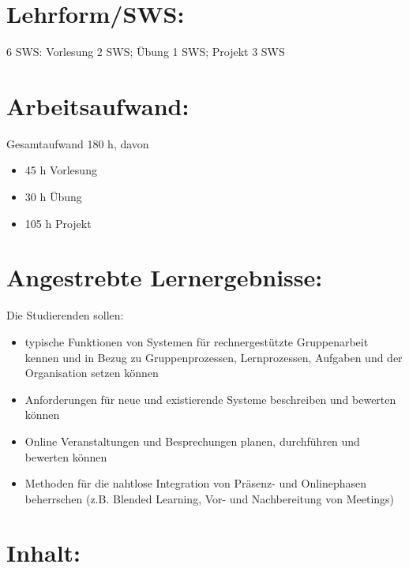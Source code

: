 \section*{Lehrform/SWS:}\label{lehrformsws-13}

6 SWS: Vorlesung 2 SWS; Übung 1 SWS; Projekt 3 SWS

\section*{Arbeitsaufwand:}\label{arbeitsaufwand-19}

Gesamtaufwand 180 h, davon

\begin{itemize}
\item
  45 h Vorlesung
\item
  30 h Übung
\item
  105 h Projekt
\end{itemize}

\section*{Angestrebte
Lernergebnisse:}\label{angestrebte-lernergebnisse-13}

Die Studierenden sollen:

\begin{itemize}
\item
  typische Funktionen von Systemen für rechnergestützte Gruppenarbeit
  kennen und in Bezug zu Gruppenprozessen, Lernprozessen, Aufgaben und
  der Organisation setzen können
\item
  Anforderungen für neue und existierende Systeme beschreiben und
  bewerten können
\item
  Online Veranstaltungen und Besprechungen planen, durchführen und
  bewerten können
\item
  Methoden für die nahtlose Integration von Präsenz- und Onlinephasen
  beherrschen (z.B. Blended Learning, Vor- und Nachbereitung von
  Meetings)
\end{itemize}

\section*{Inhalt:}\label{inhalt-13}

